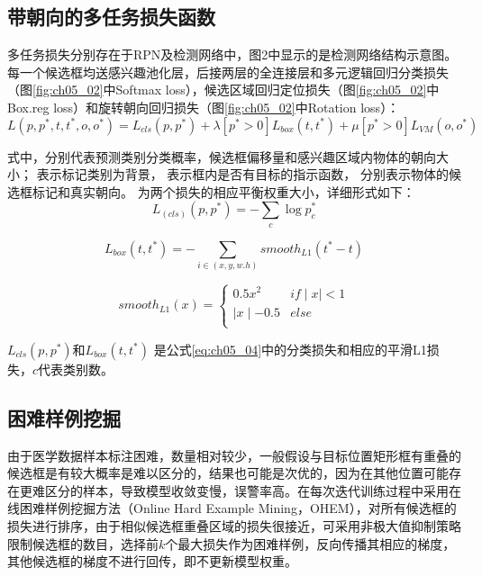 \subsection{带朝向的多任务损失函数}

多任务损失分别存在于RPN及检测网络中，图2中显示的是检测网络结构示意图。每一个候选框均送感兴趣池化层，后接两层的全连接层和多元逻辑回归分类损失（图\ref{fig:ch05_02}中Softmax loss），候选区域回归定位损失（图\ref{fig:ch05_02}中Box.reg loss）和旋转朝向回归损失（图\ref{fig:ch05_02}中Rotation loss）：
\begin{equation} \label{eq:ch05_10}
      L(p,p^*,t,t^*,o,o^*)=L_{cls}(p,p^*)+\lambda[p^*> 0]L_{box}(t,t^*)+\mu [p^*> 0]L_{VM}(o,o^*)
\end{equation} 

式中，分别代表预测类别分类概率，候选框偏移量和感兴趣区域内物体的朝向大小； 表示标记类别为背景， 表示框内是否有目标的指示函数， 分别表示物体的候选框标记和真实朝向。 为两个损失的相应平衡权重大小，详细形式如下：
 \begin{equation} \label{eq:ch05_11}
      L_{(cls)}(p,p^*)=-\sum_{c}\log p_{c}^*
\end{equation} 

 \begin{equation} \label{eq:ch05_12}
      L_{box}(t,t^*)=-\sum_{i \in {(x,y,w.h)}}smooth_{L1}(t^*-t)
\end{equation} 

\begin{equation} \label{eq:ch05_13}
smooth_{L1}(x)= \left\{
     \begin{matrix}
0.5x^2 & if \mid x\mid<1 \\
 \mid x\mid-0.5 & else \\
\end{matrix}\right.
\end{equation} 

 $L_{cls}(p,p^*)$和$L_{box}(t,t^*)$ 是公式\ref{eq:ch05_04}中的分类损失和相应的平滑L1损失，$c$代表类别数。
\subsection{困难样例挖掘}

由于医学数据样本标注困难，数量相对较少，一般假设与目标位置矩形框有重叠的候选框是有较大概率是难以区分的，结果也可能是次优的，因为在其他位置可能存在更难区分的样本，导致模型收敛变慢，误警率高。在每次迭代训练过程中采用在线困难样例挖掘方法（Online Hard Example Mining，OHEM）\citep{Shrivastava2016a}，对所有候选框的损失进行排序，由于相似候选框重叠区域的损失很接近，可采用非极大值抑制策略限制候选框的数目，选择前$k$个最大损失作为困难样例，反向传播其相应的梯度，其他候选框的梯度不进行回传，即不更新模型权重。 


